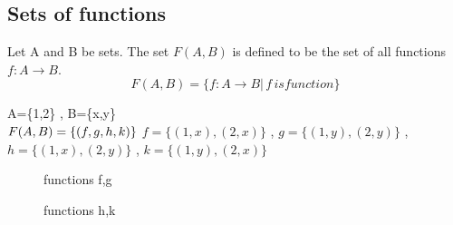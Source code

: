 \documentclass[a4paper,english,12pt]{article}   	%
\begin{document}
\subsection{Sets of functions}
\begin{defn} Let A and B be sets. The set $F(A,B)$ is defined to be the set of all functions $f \colon A \to B$.
\[ F(A,B) = \{f \colon A \to B |\, f \,is function \} \]
\end{defn}
\begin{exmp} A=\{1,2\} , B=\{x,y\} \\
$F(A,B) = \{ (f,g,h,k)\}\\$
$f=\{(1,x),(2,x)\}$ , $g=\{(1,y),(2,y)\}$ , $h=\{(1,x),(2,y)\}$ , $k=\{(1,y),(2,x)\}$
\end{exmp}
\begin{figure}[]
\centering
\scalebox{.8}{ }
\caption{functions f,g}
\label{}
\end{figure}
\begin{figure}[]
\centering
\scalebox{.8}{ }
\caption{functions h,k}
\label{}
\end{figure}
\end{document}
